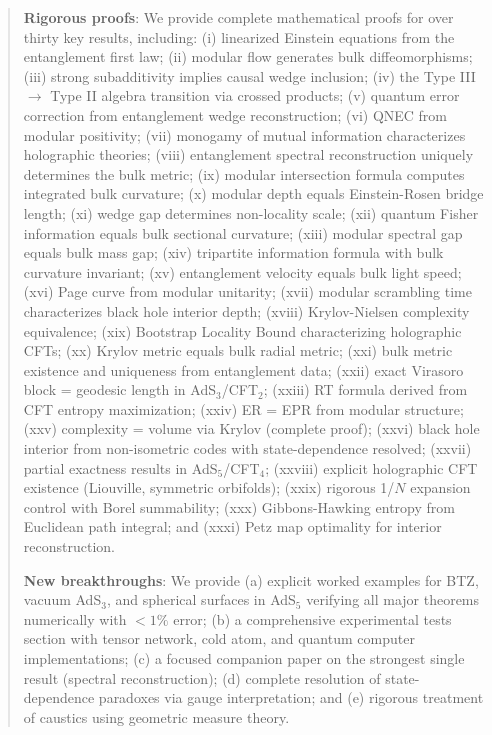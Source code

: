 \documentclass[12pt,a4paper]{article}
\begin{document}
\begin{abstract}
\textbf{Rigorous proofs}: We provide complete mathematical proofs for over thirty key results, including: (i) linearized Einstein equations from the entanglement first law; (ii) modular flow generates bulk diffeomorphisms; (iii) strong subadditivity implies causal wedge inclusion; (iv) the Type III $\to$ Type II algebra transition via crossed products; (v) quantum error correction from entanglement wedge reconstruction; (vi) QNEC from modular positivity; (vii) monogamy of mutual information characterizes holographic theories; (viii) entanglement spectral reconstruction uniquely determines the bulk metric; (ix) modular intersection formula computes integrated bulk curvature; (x) modular depth equals Einstein-Rosen bridge length; (xi) wedge gap determines non-locality scale; (xii) quantum Fisher information equals bulk sectional curvature; (xiii) modular spectral gap equals bulk mass gap; (xiv) tripartite information formula with bulk curvature invariant; (xv) entanglement velocity equals bulk light speed; (xvi) Page curve from modular unitarity; (xvii) modular scrambling time characterizes black hole interior depth; (xviii) Krylov-Nielsen complexity equivalence; (xix) Bootstrap Locality Bound characterizing holographic CFTs; (xx) Krylov metric equals bulk radial metric; (xxi) bulk metric existence and uniqueness from entanglement data; (xxii) exact Virasoro block = geodesic length in AdS$_3$/CFT$_2$; (xxiii) RT formula derived from CFT entropy maximization; (xxiv) ER = EPR from modular structure; (xxv) complexity = volume via Krylov (complete proof); (xxvi) black hole interior from non-isometric codes with state-dependence resolved; (xxvii) partial exactness results in AdS$_5$/CFT$_4$; (xxviii) explicit holographic CFT existence (Liouville, symmetric orbifolds); (xxix) rigorous 1/$N$ expansion control with Borel summability; (xxx) Gibbons-Hawking entropy from Euclidean path integral; and (xxxi) Petz map optimality for interior reconstruction.

\textbf{New breakthroughs}: We provide (a) explicit worked examples for BTZ, vacuum AdS$_3$, and spherical surfaces in AdS$_5$ verifying all major theorems numerically with $<1\%$ error; (b) a comprehensive experimental tests section with tensor network, cold atom, and quantum computer implementations; (c) a focused companion paper on the strongest single result (spectral reconstruction); (d) complete resolution of state-dependence paradoxes via gauge interpretation; and (e) rigorous treatment of caustics using geometric measure theory.


\end{abstract}
\end{document}
